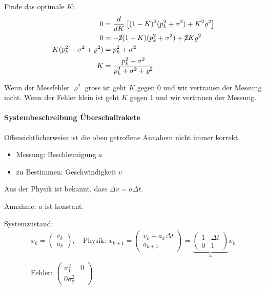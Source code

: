 \documentclass[10pt,a4paper]{scrartcl}
\begin{document}
Finde das optimale $K$:
\begin{align*}
0 &= \frac{d}{dK} \left[ (1-K)^2 (p_k^2+\sigma^2) + K^2 \varrho^2 \right]  \\
0 &= -\cancel{2} (1-K) (p_k^2 + \sigma^2) + \cancel{2} K\varrho^2  \\
K(p_k^2 + \sigma^2 + \varrho^2) &= p_k^2 + \sigma^2 \\
K &= \frac{p_k^2 + \sigma^2}{p_k^2+\sigma^2+\varrho^2}
\end{align*}

Wenn der Messfehler $\varrho^2$ gross ist geht $K$ gegen 0 und wir vertrauen der Messung nicht. Wenn der Fehler klein ist geht $K$ gegen 1 und wir vertrauen der Messung.

\paragraph{Systembeschreibung Überschallrakete} Offensichtlicherweise ist die oben getroffene Annahem nicht immer korrekt.

\begin{itemize}
\item Messung: Beschleunigung $a$
\item zu Bestimmen: Geschwindigkeit $v$
\end{itemize}

Aus der Physik ist bekannt, dass $\Delta v = a \Delta t$.

Annahme: $a$ ist konstant.

Systemzustand: 
\begin{align*}
x_k = \left(\begin{matrix} v_k \\ a_k \end{matrix} \right) , \quad 
  \text{Physik: } 
  x_{k+1} = \left( \begin{matrix} 
  v_k+a_k\Delta t \\ a_{k+1} 
  \end{matrix}\right) 
    = \underbrace{\left(\begin{matrix} 1 & \Delta t \\ 0 & 1\end{matrix}\right)}_{\varphi} x_k \\
\text{Fehler: } \left(\begin{matrix} \sigma_1^2 & 0 \\ 0 \sigma_2^2 \end{matrix}\right) 
\end{align*}
\end{document}
